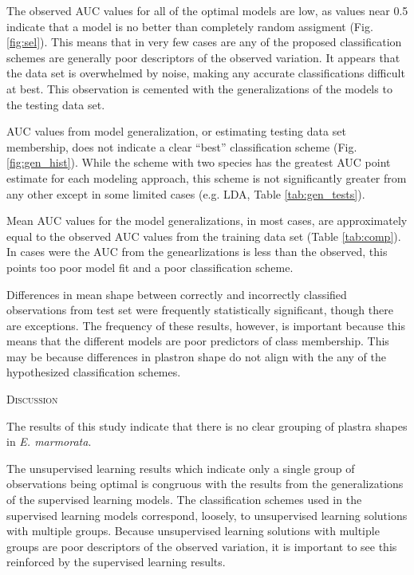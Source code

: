 \documentclass[12pt,letterpaper]{article}
\renewcommand{\section}[1]{%
\bigskip
\begin{center}
\begin{Large}
\normalfont\scshape #1
\medskip
\end{Large}
\end{center}}
\begin{document}
The observed AUC values for all of the optimal models are low, as values near 0.5 indicate that a model is no better than completely random assigment (Fig. \ref{fig:sel}). This means that in very few cases are any of the proposed classification schemes are generally poor descriptors of the observed variation. It appears that the data set is overwhelmed by noise, making any accurate classifications difficult at best. This observation is cemented with the generalizations of the models to the testing data set.

AUC values from model generalization, or estimating testing data set membership, does not indicate a clear ``best'' classification scheme (Fig. \ref{fig:gen_hist}). While the scheme with two species has the greatest AUC point estimate for each modeling approach, this scheme is not significantly greater from any other except in some limited cases (e.g. LDA, Table \ref{tab:gen_tests}). 

Mean AUC values for the model generalizations, in most cases, are approximately equal to the observed AUC values from the training data set (Table \ref{tab:comp}). In cases were the AUC from the  genearlizations is less than the observed, this points too poor model fit and a poor classification scheme.

Differences in mean shape between correctly and incorrectly classified observations from test set were frequently statistically significant, though there are exceptions. The frequency of these results, however, is important because this means that the different models are poor predictors of class membership. This may be because differences in plastron shape do not align with the any of the hypothesized classification schemes.


\section{Discussion}

The results of this study indicate that there is no clear grouping of plastra shapes in \textit{E. marmorata}.

The unsupervised learning results which indicate only a single group of observations being optimal is congruous with the results from the generalizations of the supervised learning models. The classification schemes used in the supervised learning models correspond, loosely, to unsupervised learning solutions with multiple groups. Because unsupervised learning solutions with multiple groups are poor descriptors of the observed variation, it is important to see this reinforced by the supervised learning results.
\end{document}
